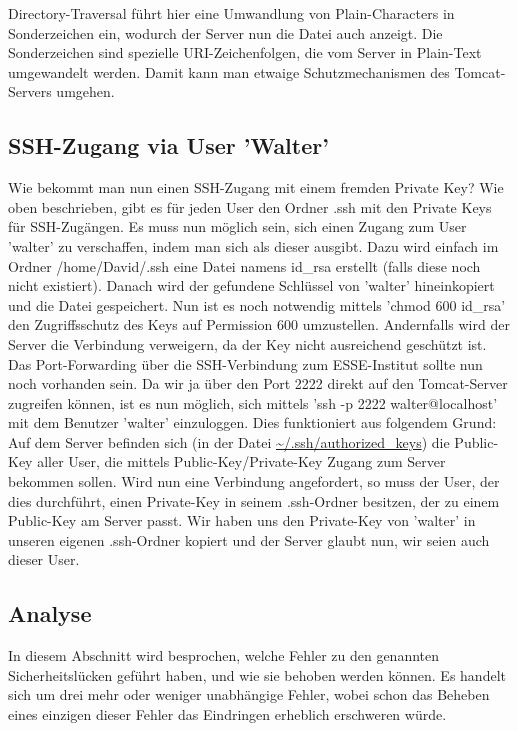 Directory-Traversal führt hier eine Umwandlung von Plain-Characters in Sonderzeichen ein, wodurch der Server nun die Datei auch
anzeigt. Die Sonderzeichen sind spezielle URI-Zeichenfolgen, die vom Server in Plain-Text umgewandelt werden. Damit kann
man etwaige Schutzmechanismen des Tomcat-Servers umgehen.

\subsection{SSH-Zugang via User 'Walter'}
Wie bekommt man nun einen SSH-Zugang mit einem fremden Private Key?
Wie oben beschrieben, gibt es für jeden User den Ordner .ssh mit den Private Keys für SSH-Zugängen. Es muss nun
möglich sein, sich einen Zugang zum User 'walter' zu verschaffen, indem man sich als dieser ausgibt. Dazu
wird einfach im Ordner /home/David/.ssh eine Datei namens id\_rsa erstellt (falls diese noch nicht existiert). Danach wird
der gefundene Schlüssel von 'walter' hineinkopiert und die Datei gespeichert. Nun ist es noch notwendig mittels 'chmod
600 id\_rsa' den Zugriffsschutz des Keys auf Permission 600 umzustellen. Andernfalls wird der Server die Verbindung
verweigern, da der Key nicht ausreichend geschützt ist. Das Port-Forwarding über die SSH-Verbindung zum ESSE-Institut
sollte nun noch vorhanden sein. Da wir ja über den Port 2222 direkt auf den Tomcat-Server zugreifen können, ist es nun
möglich, sich mittels 'ssh -p 2222 walter@localhost' mit dem Benutzer 'walter' einzuloggen. Dies funktioniert aus folgendem
Grund:\linebreak
Auf dem Server befinden sich (in der Datei \url{~/.ssh/authorized_keys}) die Public-Key aller User, die mittels Public-Key/Private-Key Zugang zum Server bekommen sollen. Wird nun eine Verbindung angefordert, so muss der User, der dies durchführt, einen Private-Key in seinem .ssh-Ordner besitzen, der zu einem Public-Key am Server passt.
Wir haben uns den Private-Key von 'walter' in unseren eigenen .ssh-Ordner kopiert und der Server glaubt nun, wir seien
auch dieser User.

\subsection{Analyse}
In diesem Abschnitt wird besprochen, welche Fehler zu den genannten Sicherheitslücken geführt haben, und wie sie behoben werden können. Es handelt sich um drei mehr oder weniger unabhängige Fehler, wobei schon das Beheben eines einzigen dieser Fehler das Eindringen erheblich erschweren würde.

